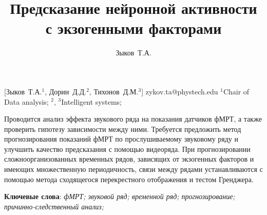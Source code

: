 \documentclass[12pt, twoside]{article}
\begin{document}
\title
    [Предсказание нейронной активности с экзогенными факторами] %
    {Предсказание нейронной активности с экзогенными факторами}
\author
    [Зыков Т.А.] %
    {Зыков~Т.А.} %
    [Зыков~Т.А.$^1$, Дорин~Д.Д.$^2$, Тихонов~Д.М.$^{3}$] %
\email
    {zykov.ta@phystech.edu}
\organization
    {$^1$Chair of Data analysis; $^2$, $^3$Intelligent systems;}
\abstract
    {%

    Проводится анализ эффекта звукового ряда на показания датчиков фМРТ, а также проверить гипотезу зависимости между ними. Требуется предложить метод прогнозирования показаний фМРТ по прослушиваемому звуковому ряду и улучшить качество предсказания с помощью видеоряда. При прогнозировании сложноорганизованных временных рядов, зависящих от экзогенных факторов и имеющих множественную периодичность, связи между рядами устанавливаются с помощью метода сходящегося перекрестного отображения и тестом Гренджера. 
    
	
	
 	
	
\bigskip
\noindent
\textbf{Ключевые слова}: \emph {фМРТ; звуковой ряд; временной ряд; прогнозирование; причинно-следственный анализ;}
}
\end{document}
